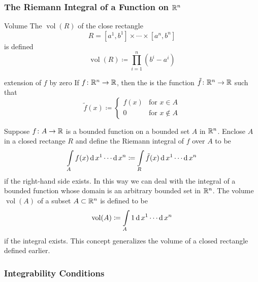 \subsubsection{The Riemann Integral of a Function on \(\mathbb{R}^n\)}

\begin{definition}{Volume}{}
    The  \(\operatorname{vol}(R)\) of the close rectangle 
    \[
        R = [a^1, b^1] \times \cdots \times [a^n, b^n]
    \]
    is defined 
    \[
        \operatorname{vol}(R) \coloneqq \prod_{i=1}^n (b^i - a^i)
    \]
\end{definition}
\begin{definition}{extension of \(f\) by zero}{}
    If \(f \colon \mathbb{R}^n \rightarrow \mathbb{R}\), then the  is the function \(\tilde{f} \colon \mathbb{R}^n \rightarrow \mathbb{R}\) such that 
    \[
        \tilde{f}(x) \coloneqq \begin{cases}
            f(x) & \text{for } x\in A \\  
            0 & \text{for } x\notin A 
        \end{cases}    
    \]
\end{definition}
Suppose \(f \colon A \rightarrow \mathbb{R}\) is a bounded function on a bounded set \(A\) in \(\mathbb{R}^n\).
Enclose \(A\) in a closed rectange \(R\) and define the Riemann integral of \(f\) over \(A\) to be 
\[
    \int\limits_A  f(x) \operatorname{d} x^1 \cdots \operatorname{d} x^n \coloneqq \int\limits_R \tilde{f}(x)  \operatorname{d} x^1 \cdots \operatorname{d} x^n
\]
if the right-hand side exists. 
In this way we can deal with the integral of a bounded function whose domain is an arbitrary bounded set in \(\mathbb{R}^n\).
The volume \(\operatorname{vol}(A)\) of a subset \(A \subset \mathbb{R}^n\) is defined to be
\[
    \operatorname{vol}(A) \coloneqq \int\limits_A  1 \operatorname{d} x^1 \cdots \operatorname{d} x^n 
\]
if the integral exists.
This concept generalizes the volume of a closed rectangle defined earlier.

\subsubsection{Integrability Conditions}

